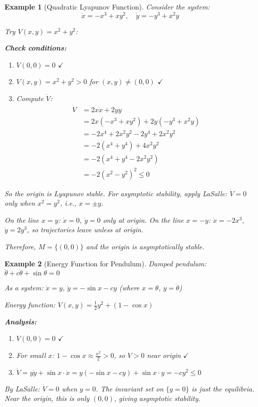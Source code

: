 \documentclass[12pt]{article}
\newtheorem{example}{Example}
\begin{document}
\begin{example}[Quadratic Lyapunov Function]
Consider the system:
$$\dot{x} = -x^3 + xy^2, \quad \dot{y} = -y^3 + x^2y$$

Try $V(x,y) = x^2 + y^2$:

\textbf{Check conditions:}
\begin{enumerate}
    \item $V(0,0) = 0$ $\checkmark$
    \item $V(x,y) = x^2 + y^2 > 0$ for $(x,y) \neq (0,0)$ $\checkmark$
    \item Compute $\dot{V}$:
    \begin{align}
    \dot{V} &= 2x\dot{x} + 2y\dot{y}\\
    &= 2x(-x^3 + xy^2) + 2y(-y^3 + x^2y)\\
    &= -2x^4 + 2x^2y^2 - 2y^4 + 2x^2y^2\\
    &= -2(x^4 + y^4) + 4x^2y^2\\
    &= -2(x^4 + y^4 - 2x^2y^2)\\
    &= -2(x^2 - y^2)^2 \leq 0
    \end{align}
\end{enumerate}

So the origin is Lyapunov stable. For asymptotic stability, apply LaSalle:
$\dot{V} = 0$ only when $x^2 = y^2$, i.e., $x = \pm y$.

On the line $x = y$: $\dot{x} = 0$, $\dot{y} = 0$ only at origin.
On the line $x = -y$: $\dot{x} = -2x^3$, $\dot{y} = 2y^3$, so trajectories leave unless at origin.

Therefore, $M = \{(0,0)\}$ and the origin is asymptotically stable.
\end{example}

\begin{example}[Energy Function for Pendulum]
Damped pendulum: $\ddot{\theta} + c\dot{\theta} + \sin\theta = 0$

As a system: $\dot{x} = y$, $\dot{y} = -\sin x - cy$ (where $x = \theta$, $y = \dot{\theta}$)

Energy function: $V(x,y) = \frac{1}{2}y^2 + (1 - \cos x)$

\textbf{Analysis:}
\begin{enumerate}
    \item $V(0,0) = 0$ $\checkmark$
    \item For small $x$: $1 - \cos x \approx \frac{x^2}{2} > 0$, so $V > 0$ near origin $\checkmark$
    \item $\dot{V} = y\dot{y} + \sin x \cdot \dot{x} = y(-\sin x - cy) + \sin x \cdot y = -cy^2 \leq 0$
\end{enumerate}

By LaSalle: $\dot{V} = 0$ when $y = 0$. The invariant set on $\{y = 0\}$ is just the equilibria. Near the origin, this is only $(0,0)$, giving asymptotic stability.
\end{example}
\end{document}
